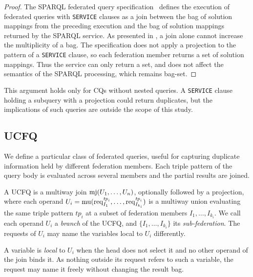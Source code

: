 \begin{proof}
  The SPARQL federated query specification~\cite{w3SPARQLFederated} defines the execution of federated queries with \texttt{SERVICE} clauses as a join between the bag of solution mappings from the preceding execution and the bag of solution mappings returned by the SPARQL service.
  As presented in , a join alone cannot increase the multiplicity of a bag.
  The specification does not apply a projection to the pattern of a \texttt{SERVICE} clause, so each federation member returns a set of solution mappings.
  Thus the service can only return a set, and does not affect the semantics of the SPARQL processing, which remains bag-set.
\end{proof}

\begin{remark}
  This argument holds only for \acp{CQ} without nested queries.
  A \texttt{SERVICE} clause holding a subquery with a projection could return duplicates, but the implications of such queries are outside the scope of this study.
\end{remark}

\subsection{\acl{UCFQ}}\label{sec:ucfq}

We define a particular class of federated queries, useful for capturing duplicate information held by different federation members.
Each triple pattern of the query body is evaluated across several members and the partial results are joined.

\begin{definition}\label{def_ucfq}
A \ac{UCFQ} is a multiway join $\operatorname{mj}(U_1, \dots, U_n)$, optionally followed by a projection, where each operand $U_i = \operatorname{mu}(\operatorname{req}_{I_1}^{\mathit{tp}_i}, \dots, \operatorname{req}_{I_{k_i}}^{\mathit{tp}_i})$ is a multiway union evaluating the same triple pattern $\mathit{tp}_i$ at a subset of federation members $I_1, \dots, I_{k_i}$.
We call each operand $U_i$ a \emph{branch} of the \ac{UCFQ}, and $\{I_1, \dots, I_{k_i}\}$ its \emph{sub-federation}.
The requests of $U_i$ may name the variables local to $U_i$ differently.
\end{definition}

A variable is \emph{local} to $U_i$ when the head does not select it and no other operand of the join binds it.
As nothing outside its request refers to such a variable, the request may name it freely without changing the result bag.

